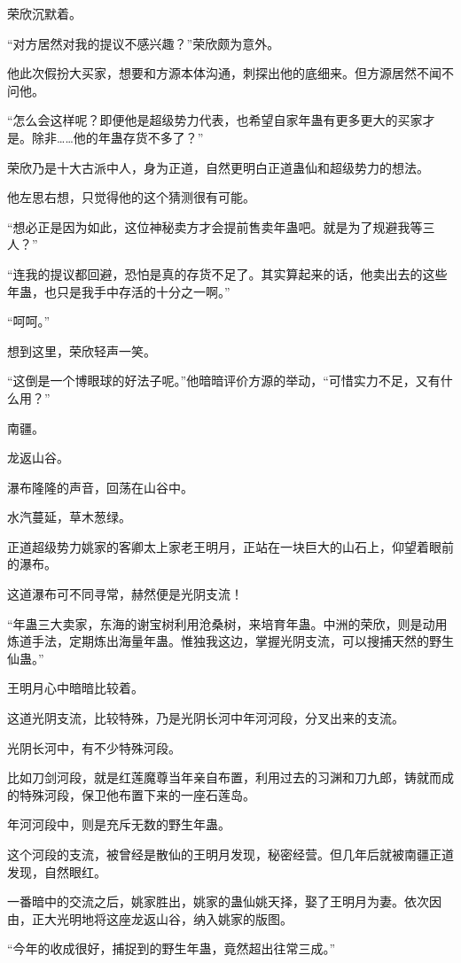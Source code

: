 \begin{this_body}
荣欣沉默着。

“对方居然对我的提议不感兴趣？”荣欣颇为意外。

他此次假扮大买家，想要和方源本体沟通，刺探出他的底细来。但方源居然不闻不问他。

“怎么会这样呢？即便他是超级势力代表，也希望自家年蛊有更多更大的买家才是。除非……他的年蛊存货不多了？”

荣欣乃是十大古派中人，身为正道，自然更明白正道蛊仙和超级势力的想法。

他左思右想，只觉得他的这个猜测很有可能。

“想必正是因为如此，这位神秘卖方才会提前售卖年蛊吧。就是为了规避我等三人？”

“连我的提议都回避，恐怕是真的存货不足了。其实算起来的话，他卖出去的这些年蛊，也只是我手中存活的十分之一啊。”

“呵呵。”

想到这里，荣欣轻声一笑。

“这倒是一个博眼球的好法子呢。”他暗暗评价方源的举动，“可惜实力不足，又有什么用？”

南疆。

龙返山谷。

瀑布隆隆的声音，回荡在山谷中。

水汽蔓延，草木葱绿。

正道超级势力姚家的客卿太上家老王明月，正站在一块巨大的山石上，仰望着眼前的瀑布。

这道瀑布可不同寻常，赫然便是光阴支流！

“年蛊三大卖家，东海的谢宝树利用沧桑树，来培育年蛊。中洲的荣欣，则是动用炼道手法，定期炼出海量年蛊。惟独我这边，掌握光阴支流，可以搜捕天然的野生仙蛊。”

王明月心中暗暗比较着。

这道光阴支流，比较特殊，乃是光阴长河中年河河段，分叉出来的支流。

光阴长河中，有不少特殊河段。

比如刀剑河段，就是红莲魔尊当年亲自布置，利用过去的习渊和刀九郎，铸就而成的特殊河段，保卫他布置下来的一座石莲岛。

年河河段中，则是充斥无数的野生年蛊。

这个河段的支流，被曾经是散仙的王明月发现，秘密经营。但几年后就被南疆正道发现，自然眼红。

一番暗中的交流之后，姚家胜出，姚家的蛊仙姚天择，娶了王明月为妻。依次因由，正大光明地将这座龙返山谷，纳入姚家的版图。

“今年的收成很好，捕捉到的野生年蛊，竟然超出往常三成。”


\end{this_body}
